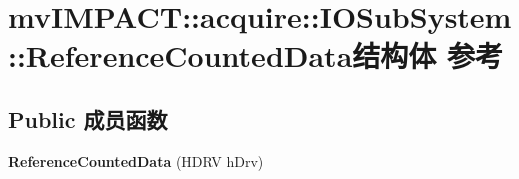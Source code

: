 \hypertarget{structmv_i_m_p_a_c_t_1_1acquire_1_1_i_o_sub_system_1_1_reference_counted_data}{\section{mv\+I\+M\+P\+A\+C\+T\+:\+:acquire\+:\+:I\+O\+Sub\+System\+:\+:Reference\+Counted\+Data结构体 参考}
\label{structmv_i_m_p_a_c_t_1_1acquire_1_1_i_o_sub_system_1_1_reference_counted_data}
}
\subsection*{Public 成员函数}
\begin{DoxyCompactItemize}
\item 
\hypertarget{structmv_i_m_p_a_c_t_1_1acquire_1_1_i_o_sub_system_1_1_reference_counted_data_af82e86ea5d91c4bd06ed8527e81bac3a}{{\bfseries Reference\+Counted\+Data} (H\+D\+R\+V h\+Drv)}\label{structmv_i_m_p_a_c_t_1_1acquire_1_1_i_o_sub_system_1_1_reference_counted_data_af82e86ea5d91c4bd06ed8527e81bac3a}

\end{DoxyCompactItemize}
